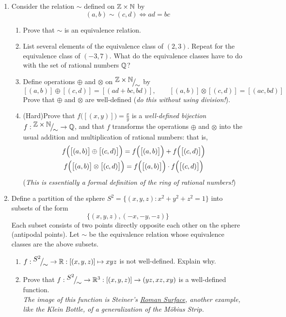 \begin{exercises}{}{}
\begin{enumerate}
		
	\item\label{ex:qequiv} Consider the relation $\sim$ defined on $\mathbb{Z}\times\mathbb{N}$ by
  \[
  	(a,b)\sim(c,d)\iff ad=bc
  \]
  \begin{enumerate}
    \item Prove that $\sim$ is an equivalence relation.
    \item List several elements of the equivalence class of $(2,3)$. Repeat for the equivalence class of $(-3,7)$. What do the equivalence classes have to do with the set of rational numbers $\mathbb{Q}$?
    \item Define operations $\oplus$ and $\otimes$ on ${}^{\textstyle {\mathbb{Z}\times\mathbb{N}}}\!\big/_{\textstyle \!{\sim}}$ by
    \[
    	[(a,b)]\oplus[(c,d)]=[(ad+bc,bd)],\qquad [(a,b)]\otimes[(c,d)]=[(ac,bd)]
    \]
    Prove that $\oplus$ and $\otimes$ are well-defined (\emph{do this without using division!}).
    \item	(Hard)\lstsp Prove that $f\bigl([(x,y)]\bigr)=\frac xy$ is a \emph{well-defined bijection} $f:{}^{\textstyle {\mathbb{Z}\times\mathbb{N}}}\!\big/_{\textstyle \!{\sim}}\to\mathbb{Q}$, and that $f$ transforms the operations $\oplus$ and $\otimes$ into the usual addition and multiplication of rational numbers: that is,
		\begin{gather*}
			f\Bigl(\bigl[(a,b)\bigr]\oplus\bigl[(c,d)\bigr]\Bigr)=f\Bigl(\bigl[(a,b)\bigr]\Bigr)+f\Bigl(\bigl[(c,d)\bigr]\Bigr)\\
			f\Bigl(\bigl[(a,b)\bigr]\otimes\bigl[(c,d)\bigr]\Bigr)=f\Bigl(\bigl[(a,b)\bigr]\Bigr)\cdot f\Bigl(\bigl[(c,d)\bigr]\Bigr)
		\end{gather*}
		(\emph{This is essentially a formal definition of the ring of rational numbers!})
  \end{enumerate}
  
  
  

	\item Define a partition of the sphere $S^2=\bigl\{(x,y,z):x^2+y^2+z^2=1\bigr\}$ into subsets of the form
	\[
		\bigl\{(x,y,z),(-x,-y,-z)\bigr\}
	\]
	Each subset consists of two points directly opposite each other on the sphere (antipodal points). Let $\sim$ be the equivalence relation whose equivalence classes are the above subsets.
	\begin{enumerate}
	  \item $f:{}^{\textstyle {S^2}}\!\big/_{\textstyle \!{\sim}}\to\mathbb{R}:[(x,y,z)]\mapsto xyz$ is not well-defined. Explain why.
	  \item Prove that $f:{}^{\textstyle {S^2}}\!\big/_{\textstyle \!{\sim}}\to\mathbb{R}^3:[(x,y,z)]\to(yz,xz,xy)$ is a well-defined function.\\
		\emph{The image of this function is Steiner's \href{http://en.wikipedia.org/wiki/Roman_surface}{Roman Surface}, another example, like the Klein Bottle, of a generalization of the M\"obius Strip.}
	\end{enumerate}
		

\end{enumerate}
\end{exercises}
